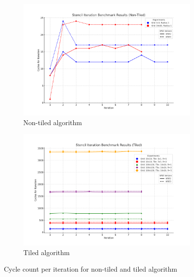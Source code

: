 \documentclass{article}
\begin{document}
\begin{figure}[h]
    \centering
    \begin{subfigure}[b]{0.48\textwidth}
        \centering
        \includegraphics[width=\textwidth]{plots/non_tiled_iteration_stability.png}
        \caption{Non-tiled algorithm}
        \label{fig:non_tiled_iteration_stability}
    \end{subfigure}
    \begin{subfigure}[b]{0.48\textwidth}
        \centering
        \includegraphics[width=\textwidth]{plots/tiled_iteration_stability.png}
        \caption{Tiled algorithm}
        \label{fig:tiled_iteration_stability}
    \end{subfigure}
    \caption{Cycle count per iteration for non-tiled and tiled algorithm}
    \label{fig:iteration_stability}
\end{figure}
\end{document}
